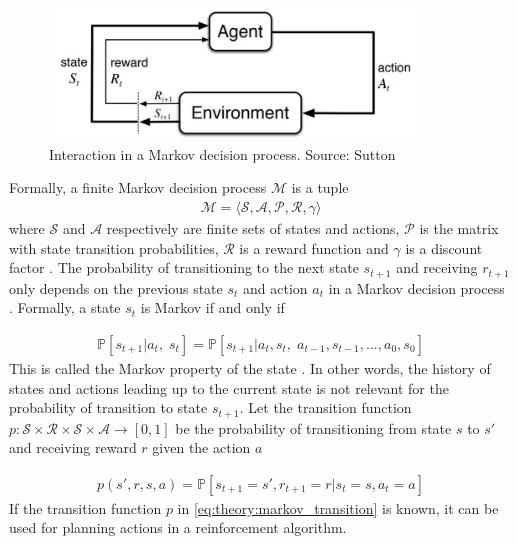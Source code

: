 \documentclass[class=book, crop=false]{standalone}
\begin{document}
\begin{figure}[ht!]
    \center
    \includegraphics[height=3.5cm, width=10cm]{figures/markov_decision_processs.JPG}
    \caption[size = 9]{Interaction in a Markov decision process. Source: Sutton \cite{Sutton1998}}
    \label{fig:theory:markov_decision_process}
\end{figure}
Formally, a finite Markov decision process $\mathcal{M}$ is a tuple
\begin{equation}
   \begin{aligned}\label{eq:theory:markov_formal}
\mathcal{M} = \langle \mathcal{S},\mathcal{A},\mathcal{P},\mathcal{R},\gamma \rangle
\end{aligned} 
\end{equation}
where $\mathcal{S}$ and $\mathcal{A}$ respectively are finite sets of states and actions, $\mathcal{P}$ is the matrix with state transition probabilities,
$\mathcal{R}$ is a reward function and $\gamma$ is a discount factor \cite{silver_course}. The probability of transitioning to the next state $s_{t+1}$ and receiving $r_{t+1}$ only depends on the previous state $s_{t}$ and action $a_{t}$ in a Markov decision process \cite{Sutton1998}. Formally, a state $s_{t}$ is Markov if and only if 

\begin{equation}
   \begin{aligned}\label{eq:theory:markov_property}
    \mathbb{P}[s_{t+1}|a_{t},\;s_{t}] = \mathbb{P}[s_{t+1}|a_{t},s_{t},\;a_{t-1},s_{t-1},...,a_{0},s_{0}]
\end{aligned} 
\end{equation}
This is called the Markov property of the state \cite{silver_course}. In other words, the history of states and actions leading up to the current state is not relevant for the probability of transition to state $s_{t+1}$. Let the transition function $p: \mathcal{S} \times \mathcal{R} \times \mathcal{S} \times \mathcal{A} \to [0,1]$ be the probability of transitioning from state $s$ to $s'$ and receiving reward $r$ given the action $a$

\begin{equation}
   \begin{aligned}\label{eq:theory:markov_transition}
    p(s',r,s,a) = \mathbb{P}
    [s_{t+1}=s',r_{t+1}=r | s_{t}=s, a_{t} = a]
\end{aligned} 
\end{equation}
If the transition function $p$ in \eqref{eq:theory:markov_transition} is known, it can be used for planning actions in a reinforcement algorithm. 
\end{document}
